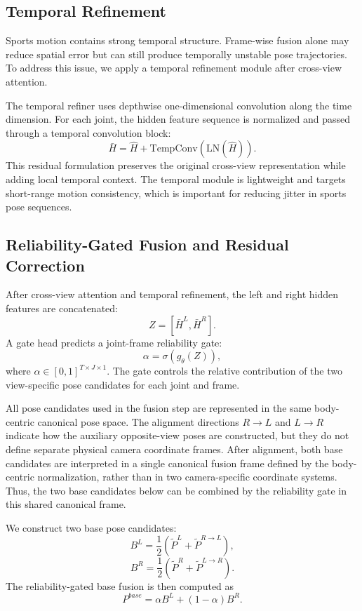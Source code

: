 \documentclass[sigconf,screen]{acmart}
\begin{document}
\subsection{Temporal Refinement}
\label{subsec:temporal_refinement}

Sports motion contains strong temporal structure. Frame-wise fusion alone may reduce spatial error but can still produce temporally unstable pose trajectories. To address this issue, we apply a temporal refinement module after cross-view attention.

The temporal refiner uses depthwise one-dimensional convolution along the time dimension. For each joint, the hidden feature sequence is normalized and passed through a temporal convolution block:
\[
\bar{H} = \hat{H} + \mathrm{TempConv}(\mathrm{LN}(\hat{H})).
\]
This residual formulation preserves the original cross-view representation while adding local temporal context. The temporal module is lightweight and targets short-range motion consistency, which is important for reducing jitter in sports pose sequences.

\subsection{Reliability-Gated Fusion and Residual Correction}
\label{subsec:reliability_fusion}

After cross-view attention and temporal refinement, the left and right hidden features are concatenated:
\[
Z = [\bar{H}^{L}, \bar{H}^{R}].
\]
A gate head predicts a joint-frame reliability gate:
\[
\alpha = \sigma(g_{\theta}(Z)),
\]
where \(\alpha \in [0,1]^{T \times J \times 1}\). The gate controls the relative contribution of the two view-specific pose candidates for each joint and frame.

All pose candidates used in the fusion step are represented in the same body-centric canonical pose space. The alignment directions \(R \rightarrow L\) and \(L \rightarrow R\) indicate how the auxiliary opposite-view poses are constructed, but they do not define separate physical camera coordinate frames. After alignment, both base candidates are interpreted in a single canonical fusion frame defined by the body-centric normalization, rather than in two camera-specific coordinate systems. Thus, the two base candidates below can be combined by the reliability gate in this shared canonical frame.

We construct two base pose candidates:
\[
B^{L} = \frac{1}{2}(\tilde{P}^{L} + \tilde{P}^{R \rightarrow L}),
\]
\[
B^{R} = \frac{1}{2}(\tilde{P}^{R} + \tilde{P}^{L \rightarrow R}).
\]
The reliability-gated base fusion is then computed as
\[
P^{base}
=
\alpha B^{L}
+
(1-\alpha)B^{R}.
\]
\end{document}
